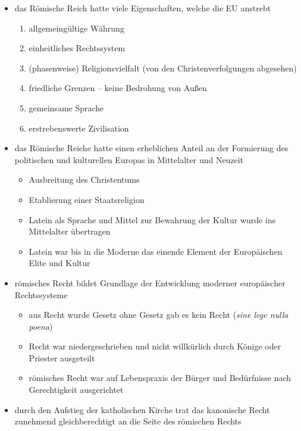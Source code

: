 \documentclass[11pt,a4paper]{article}
\begin{document}
\begin{itemize}
\item das Römische Reich hatte viele Eigenschaften, welche die EU anstrebt

	\begin{enumerate}
	\item allgemeingültige Währung
	\item einheitliches Rechtssystem
	\item (phasenweise) Religionsvielfalt (von den Christenverfolgungen abgesehen)
	\item friedliche Grenzen -- keine Bedrohung von Außen
	\item gemeinsame Sprache
	\item erstrebenswerte Zivilisation
	\end{enumerate}

\item das Römische Reiche hatte einen erheblichen Anteil an der Formierung des politischen und kulturellen Europas in Mittelalter und Neuzeit


	\begin{itemize}
	\item Ausbreitung des Christentums
	\item Etablierung einer Staatsreligion
	\item Latein als Sprache und Mittel zur Bewahrung der Kultur wurde ins Mittelalter übertragen
	\item Latein war bis in die Moderne das einende Element der Europäischen Elite und Kultur
	\end{itemize}

\item römisches Recht bildet Grundlage der Entwicklung moderner europäischer Rechtssysteme

	\begin{itemize}
	\item aus Recht wurde Gesetz
	 ohne Gesetz gab es kein Recht (\textsl{sine lege nulla poena})
	\item Recht war niedergeschrieben und nicht willkürlich durch Könige oder Priester ausgeteilt
	\item römisches Recht war auf Lebenspraxis der Bürger und Bedürfnisse nach Gerechtigkeit ausgerichtet
	\end{itemize}

\item durch den Aufstieg der katholischen Kirche trat das kanonische Recht zunehmend gleichberechtigt an die Seite des römischen Rechts


\end{itemize}
\end{document}

